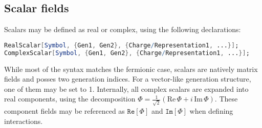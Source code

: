 \documentclass{scrartcl}
\begin{document}
\subsection{Scalar fields}
Scalars may be defined as real or complex, using the following declarations:
\begin{lstlisting}[language=mathematica,mathescape,columns=flexible,backgroundcolor=\color{light-gray}]
RealScalar[Symbol, {Gen1, Gen2}, {Charge/Representation1, ...}];
ComplexScalar[Symbol, {Gen1, Gen2}, {Charge/Representation1, ...}];
\end{lstlisting}
While most of the syntax matches the fermionic case, scalars are natively matrix fields and posses two generation indices. For a vector-like generation structure, one of them may be set to 1.\newline
Internally, all complex scalars are expanded into real components, using the decomposition $\Phi = \frac{1}{\sqrt{2}} \left(\mathrm{Re} \, \Phi + i \, \mathrm{Im} \,\Phi\right)$. These component fields may be referenced as $\mathtt{Re[\Phi]}$ and $\mathtt{Im[\Phi]}$ when defining interactions.
\FloatBarrier
\end{document}
